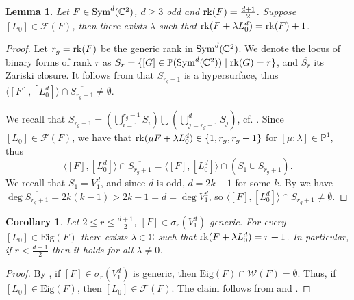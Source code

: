 \documentclass{amsart}
\numberwithin{theorem}{section}
\newtheorem{lemma}[theorem]{Lemma}
\newtheorem{corollary}[theorem]{Corollary}
\theoremstyle{definition}
\newcommand{\Eig}{\mathrm{Eig}}
\newcommand{\W}{\mathcal{W}}
\newcommand{\PP}{\mathbb{P}}
\newcommand{\CC}{\mathbb{C}}
\newcommand{\rk}{\mathop{\rm rk}\nolimits}
\newcommand{\sym}{\mathop{\rm Sym}\nolimits}
\begin{document}
\begin{lemma}\label{lemma: genrkgrow}
    Let $F\in\sym^d(\CC^{2})$, $d\geq 3$ odd and $\rk (F)=\frac{d+1}{2}$. Suppose $[L_0]\in \mathcal F(F)$, then there exists $\lambda$ such that $\rk(F+\lambda L_0^d)=\rk (F)+1$.
\end{lemma}
\begin{proof}
    Let $r_g=\rk(F)$ be the generic rank in $\sym^d(\CC^{2})$. We denote the locus of binary forms of rank $r$ as $S_r={\{[G]\in\PP(\sym^{d}(\CC^2))\mid \rk(G)=r\}}$, and $\overline{S_r}$ its Zariski closure. It follows from \cite[Proposition~4.3]{buczynski2018locus} that $ \overline{S_{r_g+1}}$ is a hypersurface, thus $\langle [F],[L_0^d]\rangle \cap \overline{S_{r_g+1}}\neq \emptyset$. 
    
    We recall that $\overline{S_{r_g+1}}=\left(\bigcup_{i=1}^{r_g-1}S_i\right)\bigcup\left(\bigcup_{j=r_g+1}^d S_j \right)$, cf. \cite[Theorem 1]{NTT}. {Since $[L_0]\in \mathcal{F}(F)$, we have} that $\rk(\mu F+\lambda L_0^d)\in\{1,r_g,r_g+1\}$ for $[\mu:\lambda]\in\PP^1$, thus $$\langle [F],[L_0^d]\rangle \cap \overline{S_{r_g+1}}=\langle [F],[L_0^d]\rangle\cap \left(S_1\cup S_{r_g+1}\right).$$ We recall that $S_1=V_1^d$, and since $d$ is odd, $d=2k-1$ for some $k$. By \cite[Theorem 4.1]{LS16} we have $\deg \overline{S_{r_g+1}}=2k(k-1)>2k-1=d=\deg V_1^d$, so $\langle [F],[L_0^d]\rangle\cap S_{r_g+1}\neq\emptyset$.
\end{proof}

\begin{corollary}\label{cor:rankgroweig}
    Let $2\leq r\leq\frac{d+1}{2}$, $[F]\in \sigma_r(V_1^d)$ generic. For every $[L_0]\in \Eig(F)$ there exists $\lambda\in\CC$ such that $\rk(F+\lambda L_0^d)=r+1$. In particular, if $r<\frac{d+1}{2}$ then it holds for all $\lambda\neq 0$.
\end{corollary}
\begin{proof}
    By , if $[F]\in \sigma_r(V_1^d)$ is generic, then $\Eig(F)\cap \W(F)=\emptyset$. Thus, if $[L_0]\in \Eig(F)$, then $[L_0]\in\mathcal F(F)$. The claim follows from  and . \qedhere
\end{proof}
\end{document}
